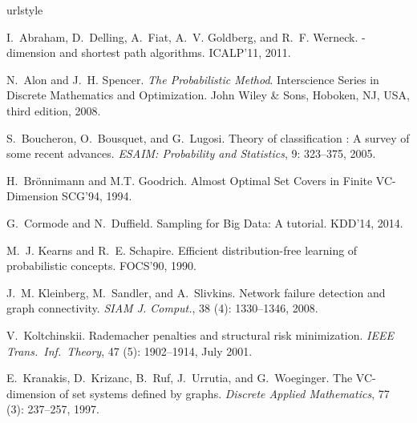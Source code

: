 \begin{thebibliography}{20}
\providecommand{\natexlab}[1]{#1}
\providecommand{\url}[1]{\texttt{#1}}
\expandafter\ifx\csname urlstyle\endcsname\relax
  \providecommand{\doi}[1]{doi: #1}\else
  \providecommand{\doi}{doi: \begingroup \urlstyle{rm}\Url}\fi

I.~Abraham, D.~Delling, A.~Fiat, A.~V. Goldberg, and R.~F. Werneck.
-dimension and shortest path algorithms.
\newblock ICALP'11, 2011. 

N.~Alon and J.~H. Spencer.
\newblock \emph{The Probabilistic Method}.
\newblock Interscience Series in Discrete Mathematics and Optimization. John
  Wiley {\&} Sons, Hoboken, NJ, USA, third edition, 2008.

S.~Boucheron, O.~Bousquet, and G.~Lugosi.
\newblock Theory of classification : A survey of some recent advances.
\newblock \emph{{ESAIM}: Probability and Statistics}, 9: 323--375,
  2005.

H.~Br\"{o}nnimann and M.T. Goodrich.
\newblock Almost Optimal Set Covers in Finite VC-Dimension
\newblock SCG'94, 1994.

G.~Cormode and N.~Duffield.
\newblock Sampling for Big Data: A tutorial. 
\newblock KDD'14, 2014.

M.~J. Kearns and R.~E. Schapire.
\newblock Efficient distribution-free learning of probabilistic concepts.
\newblock FOCS'90, 1990.

J.~M. Kleinberg, M.~Sandler, and A.~Slivkins.
\newblock Network failure detection and graph connectivity.
\newblock \emph{SIAM J. Comput.}, 38 (4): 1330--1346, 2008.

V.~Koltchinskii.
\newblock Rademacher penalties and structural risk minimization.
\newblock \emph{IEEE Trans.~Inf.~Theory}, 47 (5): 1902--1914,
  July 2001.

E.~Kranakis, D.~Krizanc, B.~Ruf, J.~Urrutia, and G.~Woeginger.
\newblock The {VC}-dimension of set systems defined by graphs.
\newblock \emph{Discrete Applied Mathematics}, 77 (3):
  237--257, 1997.


\end{thebibliography}
